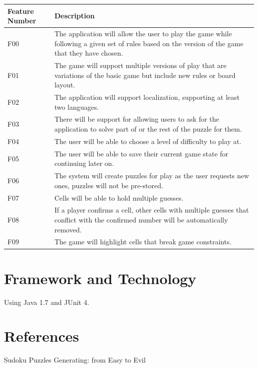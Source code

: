 \documentclass{article}
\begin{document}
\begin{tabular}{ | p{1.5in} | p{4.5in} | }
\hline
\textbf{Feature Number} & \textbf{Description}\\
\hline
\hline
F00 & The application will allow the user to play the game while following a given set of rules based on the version of the game that they have chosen.\\
\hline
F01 & The game will support multiple versions of play that are variations of the basic game but include new rules or board layout.\\
\hline
F02 & The application will support localization, supporting at least two languages.\\
\hline
F03 & There will be support for allowing users to ask for the application to solve part of or the rest of the puzzle for them.\\
\hline
F04 & The user will be able to choose a level of difficulty to play at.\\
\hline
F05 & The user will be able to save their current game state for continuing later on.\\
\hline
F06 & The system will create puzzles for play as the user requests new ones, puzzles will not be pre-stored.\\
\hline
F07 & Cells will be able to hold multiple guesses.\\
\hline
F08 & If a player confirms a cell, other cells with multiple guesses that conflict with the confirmed number will be automatically removed.\\
\hline
F09 & The game will highlight cells that break game constraints.\\
\hline
\end{tabular}

\section{Framework and Technology}
Using Java 1.7 and JUnit 4.

\section{References}
Sudoku Puzzles Generating: from Easy to Evil
\end{document}
